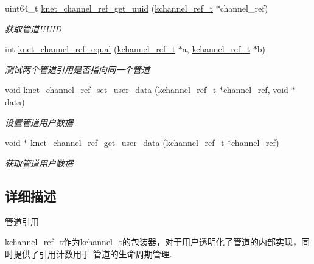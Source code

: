 \begin{DoxyCompactItemize}
uint64\+\_\+t \hyperlink{a00113_ga33f0ef5b9b57ff12a51579e222807335_ga33f0ef5b9b57ff12a51579e222807335}{knet\+\_\+channel\+\_\+ref\+\_\+get\+\_\+uuid} (\hyperlink{a00056_a3b7e82599367eade261456f60ebe2cd9_a3b7e82599367eade261456f60ebe2cd9}{kchannel\+\_\+ref\+\_\+t} $\ast$channel\+\_\+ref)
\begin{DoxyCompactList}\small\item\em 获取管道\+U\+U\+I\+D \end{DoxyCompactList}\item 
int \hyperlink{a00113_ga021034214898a7509914a336a1afb47a_ga021034214898a7509914a336a1afb47a}{knet\+\_\+channel\+\_\+ref\+\_\+equal} (\hyperlink{a00056_a3b7e82599367eade261456f60ebe2cd9_a3b7e82599367eade261456f60ebe2cd9}{kchannel\+\_\+ref\+\_\+t} $\ast$a, \hyperlink{a00056_a3b7e82599367eade261456f60ebe2cd9_a3b7e82599367eade261456f60ebe2cd9}{kchannel\+\_\+ref\+\_\+t} $\ast$b)
\begin{DoxyCompactList}\small\item\em 测试两个管道引用是否指向同一个管道 \end{DoxyCompactList}\item 
void \hyperlink{a00113_ga21f85fcd9fe24484f3dbe368eac5e9bb_ga21f85fcd9fe24484f3dbe368eac5e9bb}{knet\+\_\+channel\+\_\+ref\+\_\+set\+\_\+user\+\_\+data} (\hyperlink{a00056_a3b7e82599367eade261456f60ebe2cd9_a3b7e82599367eade261456f60ebe2cd9}{kchannel\+\_\+ref\+\_\+t} $\ast$channel\+\_\+ref, void $\ast$data)
\begin{DoxyCompactList}\small\item\em 设置管道用户数据 \end{DoxyCompactList}\item 
void $\ast$ \hyperlink{a00113_gabd02f58cb58b94071796e06bad804369_gabd02f58cb58b94071796e06bad804369}{knet\+\_\+channel\+\_\+ref\+\_\+get\+\_\+user\+\_\+data} (\hyperlink{a00056_a3b7e82599367eade261456f60ebe2cd9_a3b7e82599367eade261456f60ebe2cd9}{kchannel\+\_\+ref\+\_\+t} $\ast$channel\+\_\+ref)
\begin{DoxyCompactList}\small\item\em 获取管道用户数据 \end{DoxyCompactList}\end{DoxyCompactItemize}


\subsection{详细描述}
管道引用 


\begin{DoxyPre}
kchannel\_ref\_t作为kchannel\_t的包装器，对于用户透明化了管道的内部实现，同时提供了引用计数用于
管道的生命周期管理.\end{DoxyPre}



